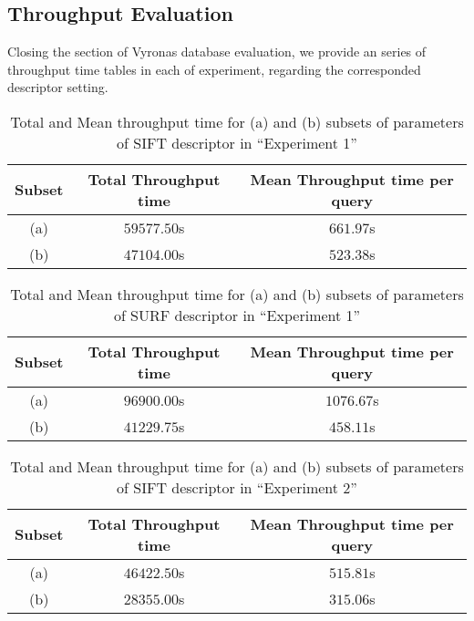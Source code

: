       \subsection{Throughput Evaluation}     
    	  
    	  Closing the section of Vyronas database evaluation, we provide an series of throughput time tables in each of experiment, regarding the corresponded descriptor setting.
    	  
    	 \begin{table}[H]%
              \centering 
              \large\begin{tabular}{|c|c|c|}
              \hline
    		    \textbf{Subset} & \textbf{Total Throughput time} & \textbf{Mean Throughput time per query}\\ \hline	      
            		(a) & $59577.50$s & $661.97$s \\ \hline
            		(b) & $47104.00$s & $523.38$s \\ \cline{1-3}
                \end{tabular}	      
    	        \caption{Total and Mean throughput time for (a) and (b) subsets of parameters of SIFT descriptor in ``Experiment 1''}
    	        \label{table:exp1_sift_bench}
          \end{table} 
          
            
	  \begin{table}[H]
	      \centering
	      \large\begin{tabular}{|c|c|c|}
	      \hline
		    \textbf{Subset} & \textbf{Total Throughput time} & \textbf{Mean Throughput time per query}\\ \hline	      
		        (a) & $96900.00$s & $1076.67$s \\
		        (b) & $41229.75$s & $458.11$s \\ \cline{1-3}
	        \end{tabular}	      
	        \caption{Total and Mean throughput time for (a) and (b) subsets of parameters of SURF descriptor in ``Experiment 1''}
	        \label{table:exp1_surf_bench}
	  \end{table}             
      
           \begin{table}[H] %
                \centering
                \large\begin{tabular}{|c|c|c|}
                    \hline
                    \textbf{Subset} & \textbf{Total Throughput time} & \textbf{Mean Throughput time per query}\\ \hline	      
                    (a) & $46422.50$s & $515.81$s \\
                    (b) & $28355.00$s & $315.06$s \\ \cline{1-3}
                \end{tabular}	      
                \caption{Total and Mean throughput time for (a) and (b) subsets of parameters of SIFT descriptor in ``Experiment 2''}
                \label{table:exp2_sift_bench}
            \end{table}

